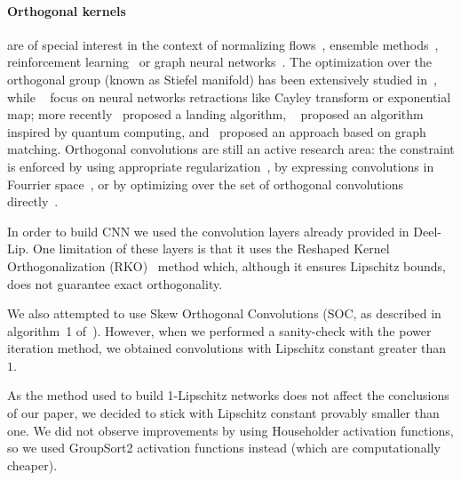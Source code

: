     \paragraph*{Orthogonal kernels} are of special interest in the context of normalizing flows~\cite{hasenclever2017variational}, ensemble methods~\cite{mashhadi2021parallel}, reinforcement learning~\cite{Gogianu2021} or graph neural networks~\cite{pmlr-v139-dasoulas21a}. The optimization over the orthogonal group (known as Stiefel manifold) has been extensively studied in~\cite{absil2009optimization}, while ~\cite{arjovsky2016unitary,hyland2017learning,hyland2017learning,lezcano2019cheap,huang2018orthogonal} focus on neural networks retractions like Cayley transform or exponential map; more recently~\cite{ablin2021fast} proposed a landing algorithm, ~\cite{kerenidis2021classical} proposed an algorithm inspired by quantum computing, and~\cite{choromanski2020stochastic} proposed an approach based on graph matching. Orthogonal convolutions are still an active research area: the constraint is enforced by using appropriate regularization~\cite{gayer2020convolutional,wang2020orthogonal}, by expressing convolutions in Fourrier space~\cite{liu2021convolutional,achour2021existence}, or by optimizing over the set of orthogonal convolutions directly~\cite{li2019preventing,trockman2021orthogonalizing,singla2021skew}. 
      
    In order to build CNN we used the convolution layers already provided in Deel-Lip. One limitation of these layers is that it uses the Reshaped Kernel Orthogonalization (RKO)~\cite{li2019preventing} method which, although it ensures Lipschitz bounds, does not guarantee exact orthogonality.  
      
    We also attempted to use Skew Orthogonal Convolutions (SOC, as described in algorithm~1 of~\cite{singla2021skew}). However, when we performed a sanity-check with the power iteration method, we obtained convolutions with Lipschitz constant greater than $1$.   
      
    As the method used to build 1-Lipschitz networks does not affect the conclusions of our paper, we decided to stick with Lipschitz constant provably smaller than one. We did not observe improvements by using Householder activation functions, so we used GroupSort2 activation functions instead (which are computationally cheaper).  
      
  
